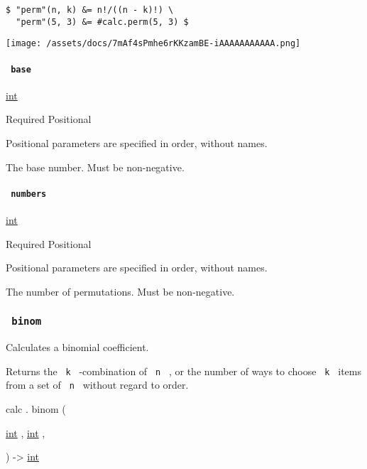 \begin{verbatim}
$ "perm"(n, k) &= n!/((n - k)!) \
  "perm"(5, 3) &= #calc.perm(5, 3) $
\end{verbatim}

\texttt{[image: /assets/docs/7mAf4sPmhe6rKKzamBE-iAAAAAAAAAAA.png]}

\paragraph{\texorpdfstring{\texttt{\ base\ }}{ base }}\label{functions-perm-base}

\href{/docs/reference/foundations/int/}{int}

{Required} {{ Positional }}

\label{functions-perm-base-positional-tooltip}
Positional parameters are specified in order, without names.

The base number. Must be non-negative.

\paragraph{\texorpdfstring{\texttt{\ numbers\ }}{ numbers }}\label{functions-perm-numbers}

\href{/docs/reference/foundations/int/}{int}

{Required} {{ Positional }}

\label{functions-perm-numbers-positional-tooltip}
Positional parameters are specified in order, without names.

The number of permutations. Must be non-negative.

\subsubsection{\texorpdfstring{\texttt{\ binom\ }}{ binom }}\label{functions-binom}

Calculates a binomial coefficient.

Returns the \texttt{\ k\ } -combination of \texttt{\ n\ } , or the
number of ways to choose \texttt{\ k\ } items from a set of
\texttt{\ n\ } without regard to order.

calc { . } { binom } (

{ \href{/docs/reference/foundations/int/}{int} , } {
\href{/docs/reference/foundations/int/}{int} , }

) -\textgreater{} \href{/docs/reference/foundations/int/}{int}

